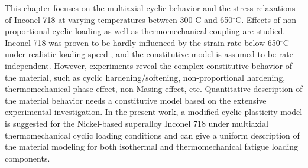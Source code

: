 
\noindent
This chapter focuses on the multiaxial cyclic behavior and the stress relaxations of Inconel 718 at varying temperatures between 300$^\circ$C and 650$^\circ$C. Effects of non-proportional cyclic loading as well as thermomechanical coupling are studied. Inconel 718 was proven to be hardly influenced by the strain rate below 650$^\circ$C under realistic loading speed \cite{kim1988elevated, Schlesinger2017}, and the constitutive model is assumed to be rate-independent. However, experiments reveal the complex constitutive behavior of the material, such as cyclic hardening/softening, non-proportional hardening, thermomechanical phase effect, non-Masing effect, etc. Quantitative description of the material behavior needs a constitutive model based on the extensive experimental investigation. In the present work, a modified cyclic plasticity model is suggested for the Nickel-based superalloy Inconel 718 under multiaxial thermomechanical cyclic loading conditions and can give a uniform description of the material modeling for both isothermal and thermomechanical fatigue loading components.

